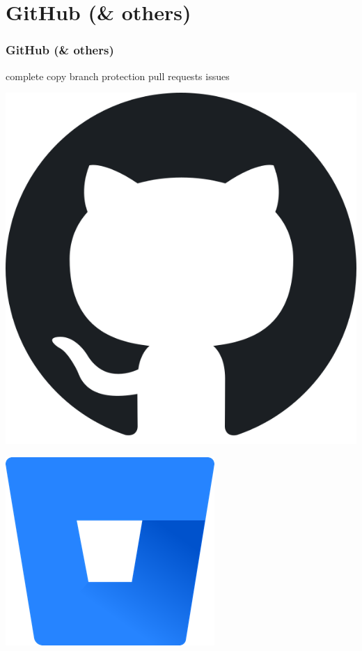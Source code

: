 \documentclass{beamer}
\begin{document}
	\section{GitHub (\& others)}
	\begin{frame}
		\frametitle{GitHub (\& others)}\pause
		
		\begin{minipage}{0.4\textwidth} 
				complete copy \newline\newline
				branch protection \newline\newline
				pull requests \newline\newline
				issues \newline

		\end{minipage}
		\hfill
		\begin{minipage}{0.4\textwidth}
		
		\includegraphics[width=.725\linewidth]{images/githublogo.png}\newline

		
		
		\includegraphics[width=.725\linewidth]{images/bitbucketlogo.png}\newline


\end{minipage}
\end{frame}
\end{document}
